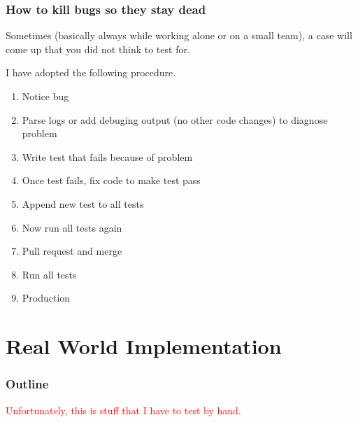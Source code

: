 \documentclass{beamer}
\begin{document}
\begin{frame}
  \frametitle{How to kill bugs so they stay dead}

  Sometimes (basically always while working alone or on a small team),
  a case will come up that you did not think to test for.

  I have adopted the following procedure.

  \begin{enumerate}
  \item Notice bug
  \item Parse logs or add debuging output
    (no other code changes)
    to diagnose problem
  \item Write test that fails because of problem
  \item Once test fails, fix code to make test pass
  \item Append new test to all tests
  \item Now run all tests again
  \item Pull request and merge
  \item Run all tests
  \item Production
  \end{enumerate}

\end{frame}

\section{Real World Implementation}

\begin{frame}
  \frametitle{Outline}
  \textcolor{red}{Unfortunately, this is stuff that I have to test by hand.}
  \tableofcontents[currentsection]
\end{frame}
\end{document}
